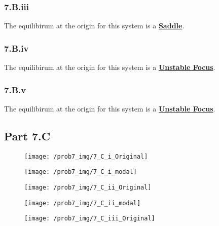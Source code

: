 \subsubsection*{7.B.iii}
The equilibirum at the origin for this system is a \underline{\textbf{Saddle}}.

\subsubsection*{7.B.iv}
The equilibirum at the origin for this system is a \underline{\textbf{Unstable Focus}}.

\subsubsection*{7.B.v}
The equilibirum at the origin for this system is a \underline{\textbf{Unstable Focus}}.

\subsection*{Part 7.C}


\begin{figure}[h]
  \centering
  \texttt{[image: /prob7\_img/7\_C\_i\_Original]}
\end{figure}

\begin{figure}[h]
  \centering
  \texttt{[image: /prob7\_img/7\_C\_i\_modal]}

\end{figure}

\begin{figure}[h]
  \centering
  \texttt{[image: /prob7\_img/7\_C\_ii\_Original]}
\end{figure}

\begin{figure}[h]
  \centering
  \texttt{[image: /prob7\_img/7\_C\_ii\_modal]}

\end{figure}

\begin{figure}[h]
  \centering
  \texttt{[image: /prob7\_img/7\_C\_iii\_Original]}
\end{figure}

